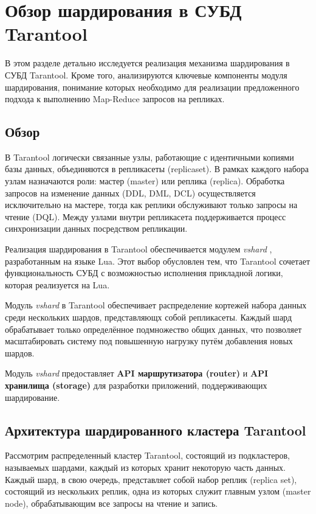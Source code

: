 \section{Обзор шардирования в СУБД Tarantool}

В этом разделе детально исследуется реализация механизма шардирования в СУБД
Tarantool. Кроме того, анализируются ключевые компоненты модуля шардирования,
понимание которых необходимо для реализации предложенного подхода к выполнению
Map-Reduce запросов на репликах.

\subsection{Обзор}

В Tarantool логически связанные узлы, работающие с идентичными копиями базы
данных, объединяются в репликасеты (replicaset). В рамках каждого набора узлам
назначаются роли: мастер (master) или реплика (replica). Обработка запросов
на изменение данных (DDL, DML, DCL) осуществляется исключительно на мастере,
тогда как реплики обслуживают только запросы на чтение (DQL). Между узлами
внутри репликасета поддерживается процесс синхронизации данных посредством
репликации.

Реализация шардирования в Tarantool обеспечивается модулем \textit{vshard}
\cite{VshardGithub}, разработанным на языке Lua. Этот выбор обусловлен тем, что
Tarantool сочетает функциональность СУБД с возможностью исполнения прикладной
логики, которая реализуется на Lua.

Модуль \textit{vshard} в Tarantool обеспечивает распределение кортежей набора
данных среди нескольких шардов, представляющх собой репликасеты. Каждый шард
обрабатывает только определённое подмножество общих данных, что позволяет
масштабировать систему под повышенную нагрузку путём добавления новых шардов.

Модуль \textit{vshard} предоставляет \textbf{API маршрутизатора (router)} и
\textbf{API хранилища (storage)} для разработки приложений, поддерживающих
шардирование.

\subsection{Архитектура шардированного кластера Tarantool}

Рассмотрим распределенный кластер Tarantool, состоящий из подкластеров,
называемых шардами, каждый из которых хранит некоторую часть данных. Каждый
шард, в свою очередь, представляет собой набор реплик (replica set), состоящий
из нескольких реплик, одна из которых служит главным узлом (master node),
обрабатывающим все запросы на чтение и запись.

